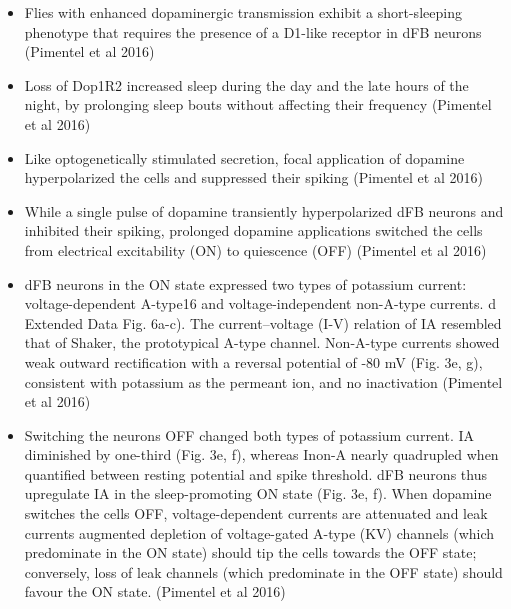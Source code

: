 \documentclass[11pt]{article}
\begin{document}
\begin{itemize}
    \item Flies with enhanced dopaminergic transmission exhibit a short-sleeping phenotype that requires the presence of a D1-like  receptor in dFB neurons
    \cite{pimentelOperationHomeostaticSleep2016} (Pimentel et al 2016)

    \item Loss of Dop1R2 increased sleep during the day and the late hours of the night, by prolonging sleep bouts without affecting their frequency
    \cite{pimentelOperationHomeostaticSleep2016} (Pimentel et al 2016)

    \item Like optogenetically stimulated secretion, focal application of dopamine hyperpolarized the cells and suppressed their spiking
    \cite{pimentelOperationHomeostaticSleep2016} (Pimentel et al 2016)

    \item While a single pulse of dopamine transiently hyperpolarized dFB neurons and inhibited their spiking, prolonged dopamine applications switched the cells from electrical excitability (ON) to quiescence (OFF)
    \cite{pimentelOperationHomeostaticSleep2016} (Pimentel et al 2016)

    \item dFB neurons in the ON state expressed two types of potassium  current: voltage-dependent A-type16 and voltage-independent non-A-type currents. d Extended Data Fig. 6a-c). The current–voltage (I-V) relation of IA resembled that of Shaker, the  prototypical A-type channel.
    Non-A-type currents showed weak outward rectification with a reversal potential of -80 mV (Fig. 3e, g), consistent with potassium as the permeant ion, and no inactivation
    \cite{pimentelOperationHomeostaticSleep2016} (Pimentel et al 2016)

    \item Switching the neurons OFF changed both types of potassium current. IA diminished by one-third (Fig. 3e, f), whereas Inon-A nearly quadrupled when quantified between resting potential and spike threshold.
    dFB neurons thus upregulate IA in the sleep-promoting ON state (Fig. 3e, f). When dopamine switches the cells OFF, voltage-dependent currents are attenuated and leak currents augmented
    depletion of voltage-gated A-type (KV) channels (which predominate in the ON state) should tip the cells towards the OFF state; conversely, loss of leak channels (which predominate in the OFF state) should favour the ON state.
    \cite{pimentelOperationHomeostaticSleep2016} (Pimentel et al 2016)


\end{itemize}
\end{document}
